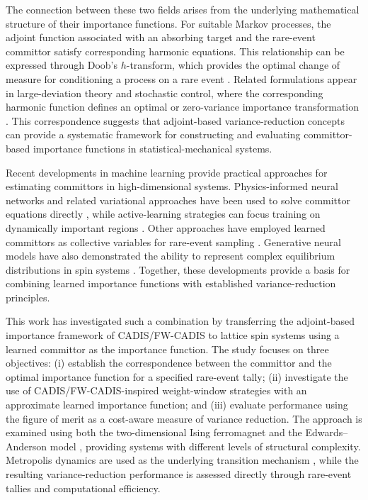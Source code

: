 \documentclass[a4paper,fleqn]{cas-sc}
\begin{document}
	The connection between these two fields arises from the underlying mathematical structure of their importance functions. For suitable Markov processes, the adjoint function associated with an absorbing target and the rare-event committor satisfy corresponding harmonic equations. This relationship can be expressed through Doob's $h$-transform, which provides the optimal change of measure for conditioning a process on a rare event \cite{doob1984}. Related formulations appear in large-deviation theory and stochastic control, where the corresponding harmonic function defines an optimal or zero-variance importance transformation \cite{chetrite2015,touchette2009,hartmann2019}. This correspondence suggests that adjoint-based variance-reduction concepts can provide a systematic framework for constructing and evaluating committor-based importance functions in statistical-mechanical systems.
	
	Recent developments in machine learning provide practical approaches for estimating committors in high-dimensional systems. Physics-informed neural networks and related variational approaches have been used to solve committor equations directly \cite{raissi2019,li2019,khoo2019}, while active-learning strategies can focus training on dynamically important regions \cite{rotskoff2020}. Other approaches have employed learned committors as collective variables for rare-event sampling \cite{trizio2025}. Generative neural models have also demonstrated the ability to represent complex equilibrium distributions in spin systems \cite{wu2019,noe2019,nicoli2020,gabrie2022}. Together, these developments provide a basis for combining learned importance functions with established variance-reduction principles.
	
	This work has investigated such a combination by transferring the adjoint-based importance framework of CADIS/FW-CADIS to lattice spin systems using a learned committor as the importance function. The study focuses on three objectives: (i) establish the correspondence between the committor and the optimal importance function for a specified rare-event tally; (ii) investigate the use of CADIS/FW-CADIS-inspired weight-window strategies with an approximate learned importance function; and (iii) evaluate performance using the figure of merit as a cost-aware measure of variance reduction. The approach is examined using both the two-dimensional Ising ferromagnet \cite{ising1925,onsager1944} and the Edwards--Anderson model \cite{edwards1975,binder1986}, providing systems with different levels of structural complexity. Metropolis dynamics are used as the underlying transition mechanism \cite{metropolis1953}, while the resulting variance-reduction performance is assessed directly through rare-event tallies and computational efficiency.
	
\end{document}
